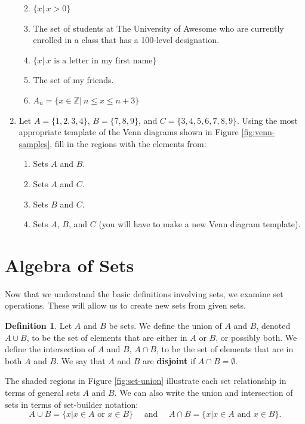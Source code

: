 \documentclass[
]{book}
\theoremstyle{definition}
\newtheorem{definition}{Definition}[chapter]
\theoremstyle{definition}
\theoremstyle{definition}
\theoremstyle{definition}
\theoremstyle{remark}
\begin{document}
\begin{enumerate}
  \begin{enumerate}
  \def\labelenumii{\alph{enumii}.}
  \item
    \(\{x \vert \: x>0\}\)
  \item
    The set of students at The University of Awesome who are currently enrolled in a class that has a 100-level designation.
  \item
    \(\{x\vert \: x \textrm{ is a letter in my first name}\}\)
  \item
    The set of my friends.
  \item
    \(A_n=\{x\in \mathbb{Z} \vert \: n\leq x\leq n+3\}\)
  \end{enumerate}
\item
  Let \(A=\{1, 2, 3, 4\}\), \(B=\{7,8,9\}\), and \(C=\{3,4,5,6,7,8,9\}\). Using the most appropriate template of the Venn diagrams shown in Figure \ref{fig:venn-samples}, fill in the regions with the elements from:

  \begin{enumerate}
  \def\labelenumii{\alph{enumii}.}
  \item
    Sets \(A\) and \(B\).
  \item
    Sets \(A\) and \(C\).
  \item
    Sets \(B\) and \(C\).
  \item
    Sets \(A\), \(B\), and \(C\) (you will have to make a new Venn diagram template).
  \end{enumerate}
\end{enumerate}

\hypertarget{algebra-of-sets}{%
\section{Algebra of Sets}\label{algebra-of-sets}}

Now that we understand the basic definitions involving sets, we examine set operations. These will allow us to create new sets from given sets.

\begin{definition}
Let \(A\) and \(B\) be sets. We define the union of \(A\) and \(B\), denoted \(A \cup B\), to be the set of elements that are either in \(A\) or \(B\), or possibly both. We define the intersection of \(A\) and \(B\), \(A \cap B\), to be the set of elements that are in both \(A\) and \(B\). We say that \(A\) and \(B\) are \textbf{disjoint} if \(A\cap B = \emptyset\).
\end{definition}

The shaded regions in Figure \ref{fig:set-union} illustrate each set relationship in terms of general sets \(A\) and \(B\). We can also write the union and intersection of sets in terms of set-builder notation:
\[A\cup B = \{x \vert x\in A \mbox{ or } x\in B\} \quad \mbox{ and } \quad A\cap B =\{x\vert x\in A \mbox{ and } x\in B\}.\]
\end{document}
